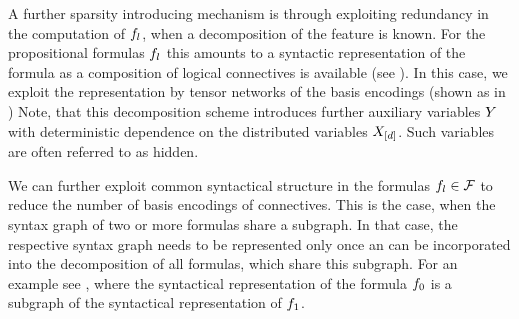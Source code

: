 A further sparsity introducing mechanism is through exploiting redundancy in the computation of $f_{l}$, when a decomposition of the feature is known.
For the propositional formulas $f_{l}$ this amounts to a syntactic representation of the formula as a composition of logical connectives is available (see ). %
In this case, we exploit the representation by tensor networks of the basis encodings (shown as  in )
Note, that this decomposition scheme introduces further auxiliary variables $Y$ with deterministic dependence on the distributed variables $X_{[d]}$.
Such variables are often referred to as hidden.

We can further exploit common syntactical structure in the formulas $f_{l}\in\mathcal{F}$ to reduce the number of basis encodings of connectives.
This is the case, when the syntax graph of two or more formulas share a subgraph.
In that case, the respective syntax graph needs to be represented only once an can be incorporated into the decomposition of all formulas, which share this subgraph.
For an example see , where the syntactical representation of the formula $f_{0}$ is a subgraph of the syntactical representation of $f_{1}$.





